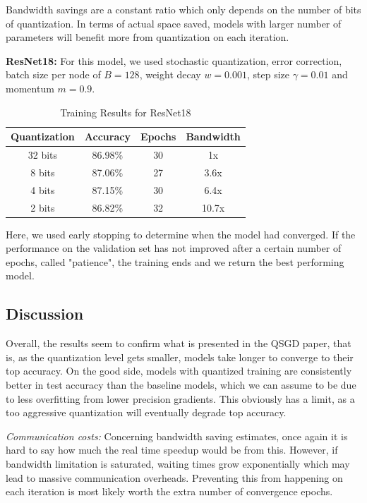 \documentclass[10pt,conference,compsocconf]{IEEEtran}
\begin{document}
\vspace{-1.5em}
Bandwidth savings are a constant ratio which only depends on the number of bits of quantization. In terms of actual space saved, models with larger number of parameters will benefit more from quantization on each iteration.
\vspace{0.3em}

\textbf{ResNet18:} For this model, we used stochastic quantization, error correction, batch size per node of $B = 128$, weight decay $w = 0.001$, step size $\gamma = 0.01$ and momentum $m = 0.9$.

\begin{table}[htbp]
  \centering
  \begin{tabular}[c]{|c||c|c|c|}
    \hline
	  Quantization&Accuracy&Epochs&Bandwidth\\
    \hline
	  32 bits&86.98\% &30&1x\\
	  8 bits&87.06\%&27&3.6x\\
	  4 bits&87.15\%&30&6.4x\\
	  2 bits&86.82\%&32&10.7x\\
    \hline
  \end{tabular}
	\vspace{0.7em}
	\caption{Training Results for ResNet18}
\end{table}
\vspace{-1.5em}


Here, we used early stopping to determine when the model had converged. If the performance on the validation set has not improved after a certain number of epochs, called "patience", the training ends and we return the best performing model.
\vspace{0.3em}


\subsection{Discussion}


Overall, the results seem to confirm what is presented in the QSGD paper, that is, as the quantization level gets smaller, models take longer to converge to their top accuracy. On the good side, models with quantized training are consistently better in test accuracy than the baseline models, which we can assume to be due to less overfitting from lower precision gradients. This obviously has a limit, as a too aggressive quantization will eventually degrade top accuracy.

\textit{Communication costs:} Concerning bandwidth saving estimates, once again it is hard to say how much the real time speedup would be from this. However, if bandwidth limitation is saturated, waiting times grow exponentially which may lead to massive communication overheads. Preventing this from happening on each iteration is most likely worth the extra number of convergence epochs. 
\end{document}
